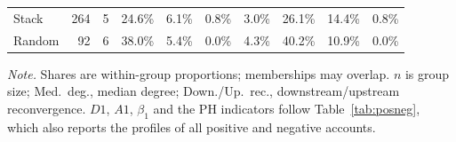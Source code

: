 \begin{table}[htbp]
\begin{threeparttable}
\begin{tabular}{lrrrrrrrrr}
Stack & 264 & 5 & 24.6\% & 6.1\% & 0.8\% & 3.0\% & 26.1\% & 14.4\% & 0.8\% \\
Random & 92 & 6 & 38.0\% & 5.4\% & 0.0\% & 4.3\% & 40.2\% & 10.9\% & 0.0\% \\
\bottomrule
\end{tabular}
\begin{tablenotes}[flushleft]
\scriptsize
\setlength{\labelsep}{0pt}\item[] \textit{Note.} Shares are within-group proportions; memberships may overlap. $n$ is group size; Med.\ deg., median degree; Down./Up.\ rec., downstream/upstream reconvergence. $D1$, $A1$, $\beta_1$ and the PH indicators follow Table~\ref{tab:posneg}, which also reports the profiles of all positive and negative accounts.
\end{tablenotes}
\end{threeparttable}
\end{table}
